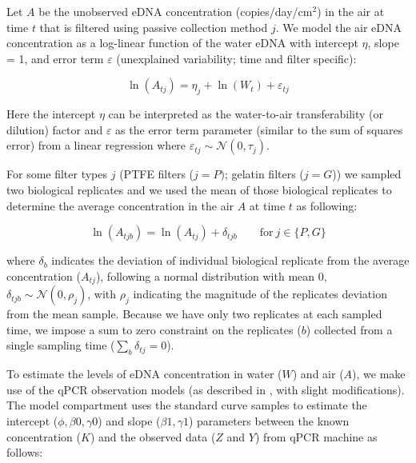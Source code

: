 \documentclass{article}
\begin{document}
Let $A$ be the unobserved eDNA concentration (copies/day/cm$^2$) in the air at time $t$ that is filtered using passive collection method $j$. We model the air eDNA concentration as a log-linear function of the water eDNA with intercept $\eta$, slope = 1, and error term $\varepsilon$ (unexplained variability; time and filter specific):

\begin{equation}
\ln(A_{tj}) = \eta_{j} + \ln(W_{t}) + \varepsilon_{tj}
\end{equation}

Here the intercept $\eta$ can be interpreted as the water-to-air transferability (or dilution) factor and $\varepsilon$  as the error term parameter (similar to the sum of squares error) from a linear regression where $\varepsilon_{tj} \sim \mathcal{N}(0,\tau_j)$.

For some filter types $j$ (PTFE filters (${j=P})$; gelatin filters (${j=G}$)) we sampled two biological replicates and we used the mean of those biological replicates to determine the average concentration in the air $A$ at time $t$ as following:

\begin{equation}
\ln(A_{tjb}) = \ln(A_{tj}) + \delta_{tjb} \qquad \text{for} \ j \in \{P,G\}
\end{equation}


where $\delta_b$ indicates the deviation of individual biological replicate from the average concentration ($A_{tj}$), following a normal distribution with mean 0, $\delta_{tjb} \sim \mathcal{N}(0,\rho_j)$, with $\rho_j$ indicating the magnitude of the replicates deviation from the mean sample. Because we have only two replicates at each sampled time, we impose a sum to zero constraint on the replicates ($b$) collected from a single sampling time ($\sum_b \delta_{tj} = 0$).

To estimate the levels of eDNA concentration in water ($W$) and air ($A$), we make use of the qPCR observation models (as described in \cite{guri2024, shelton2022}, with slight modifications). The model compartment uses the standard curve samples to estimate the intercept ($\phi,\beta0,\gamma0$) and slope ($\beta1, \gamma1$) parameters between the known concentration ($K$) and the observed data ($Z$ and $Y$) from qPCR machine as follows:
\end{document}
